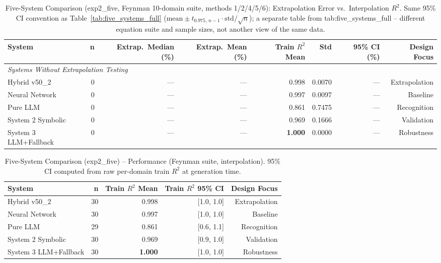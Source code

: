 \begin{table}[t]
\centering
\caption{Five-System Comparison (exp2\_five, Feynman 10-domain suite,
  methods 1/2/4/5/6): Extrapolation Error vs.\ Interpolation $R^2$.
  Same 95\% CI convention as Table~\ref{tab:five_systems_full}
  ($\mathrm{mean} \pm t_{0.975,\,n-1} \cdot \mathrm{std}/\sqrt{n}$); a
  separate table from tab:five\_systems\_full -- different equation suite
  and sample sizes, not another view of the same data.}
\label{tab:five_systems_full_exp2five}
\begin{tabular}{lrrrrrrr}
\toprule
\textbf{System} & \textbf{n}
  & \textbf{Extrap.\ Median (\%)} & \textbf{Extrap.\ Mean (\%)}
  & \textbf{Train $R^2$ Mean} & \textbf{Std} & \textbf{95\% CI (\%)}
  & \textbf{Design Focus} \\
\midrule
\midrule
\multicolumn{8}{l}{\textit{Systems Without Extrapolation Testing}} \\
Hybrid v50\_2 & 0 & --- & --- & 0.998 & 0.0070 & --- & Extrapolation \\
Neural Network & 0 & --- & --- & 0.997 & 0.0097 & --- & Baseline \\
Pure LLM & 0 & --- & --- & 0.861 & 0.7475 & --- & Recognition \\
System 2 Symbolic & 0 & --- & --- & 0.969 & 0.1666 & --- & Validation \\
System 3 LLM+Fallback & 0 & --- & --- & \textbf{1.000} & 0.0000 & --- & Robustness \\
\bottomrule
\end{tabular}
\end{table}

\begin{table}[t]
\centering
\caption{Five-System Comparison (exp2\_five) -- Performance (Feynman suite,
  interpolation). 95\% CI computed from raw per-domain train $R^2$ at
  generation time.}
\label{tab:five_systems_performance_exp2five}
\begin{tabular}{lrrrr}
\toprule
\textbf{System} & \textbf{n} & \textbf{Train $R^2$ Mean}
  & \textbf{Train $R^2$ 95\% CI} & \textbf{Design Focus} \\
\midrule
Hybrid v50\_2 & 30 & 0.998 & [1.0, 1.0] & Extrapolation \\
Neural Network & 30 & 0.997 & [1.0, 1.0] & Baseline \\
Pure LLM & 29 & 0.861 & [0.6, 1.1] & Recognition \\
System 2 Symbolic & 30 & 0.969 & [0.9, 1.0] & Validation \\
System 3 LLM+Fallback & 30 & \textbf{1.000} & [1.0, 1.0] & Robustness \\
\bottomrule
\end{tabular}
\end{table}

